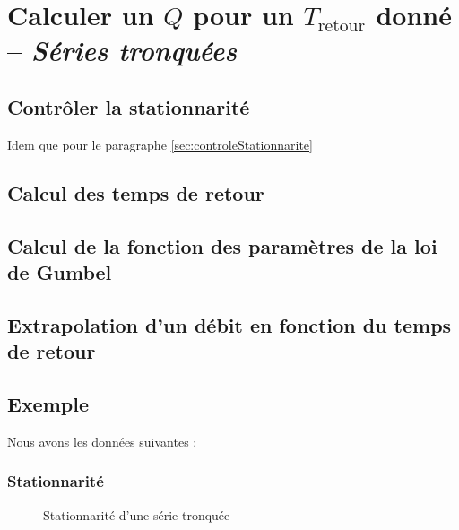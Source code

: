 \chapter{Calculer un $Q$ pour un $T_\text{retour}$ donné -- \textit{Séries tronquées}}



\section{Contrôler la stationnarité}
Idem que pour le paragraphe \ref{sec:controleStationnarite}

\section{Calcul des temps de retour}
\section{Calcul de la fonction des paramètres de la loi de Gumbel}
\section{Extrapolation d'un débit en fonction du temps de retour}


\section{Exemple}
Nous avons les données suivantes :



\subsection{Stationnarité}
\begin{figure}[H]
    \centering
    \resizebox*{0.45\textwidth}{!}{
        
    }
    \caption{Stationnarité d'une série tronquée}
    \label{graph:stationnarite_serieTronquee}
\end{figure}

